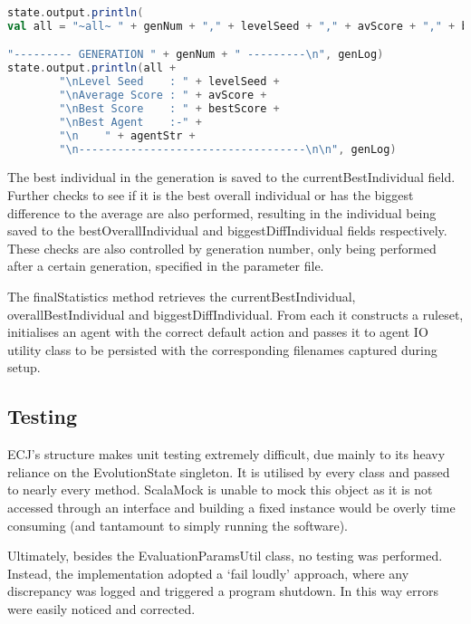 \begin{minipage}{0.9\linewidth}
\centering
\begin{lstlisting}[language=scala]
state.output.println(
val all = "~all~ " + genNum + "," + levelSeed + "," + avScore + "," + bestScore

"--------- GENERATION " + genNum + " ---------\n", genLog)
state.output.println(all + 
        "\nLevel Seed    : " + levelSeed + 
        "\nAverage Score : " + avScore + 
        "\nBest Score    : " + bestScore + 
        "\nBest Agent    :-" +
        "\n    " + agentStr + 
        "\n-----------------------------------\n\n", genLog)
\end{lstlisting}
\end{minipage}
 
The best individual in the generation is saved to the currentBestIndividual field. Further checks to see if it is the best overall individual or has the biggest difference to the average are also performed, resulting in the individual being saved to the bestOverallIndividual and biggestDiffIndividual fields respectively. These checks are also controlled by generation number, only being performed after a certain generation, specified in the parameter file.

The finalStatistics method retrieves the current\-Best\-Individual, overall\-Best\-Individual and biggest\-Diff\-Individual. From each it constructs a ruleset, initialises an agent with the correct default action and passes it to agent IO utility class to be persisted with the corresponding filenames captured during setup.



\subsection{Testing}
\label{subsec:learntest}

ECJ's structure makes unit testing extremely difficult, due mainly to its heavy reliance on the EvolutionState singleton. It is utilised by every class and passed to nearly every method. ScalaMock is unable to mock this object as it is not accessed through an interface and building a fixed instance would be overly time consuming (and tantamount to simply running the software).

Ultimately, besides the EvaluationParamsUtil class, no testing was performed. Instead, the implementation adopted a `fail loudly' approach, where any discrepancy was logged and triggered a program shutdown. In this way errors were easily noticed and corrected.


